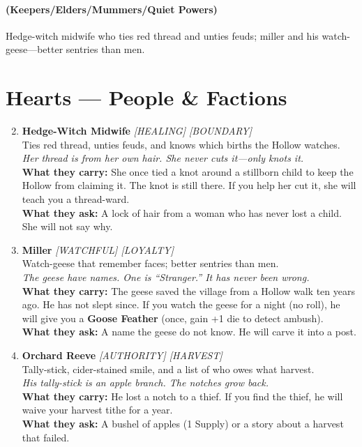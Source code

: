 \paragraph*{(Keepers/Elders/Mummers/Quiet Powers)} Hedge-witch midwife who ties red thread and unties feuds; miller and his watch-geese---better sentries than men.

\section*{Hearts --- People \& Factions}
\label{sec:aelaerem-people}
\begin{enumerate}
\setcounter{enumi}{1}
\item \textbf{Hedge-Witch Midwife} \hfill \textit{[HEALING] [BOUNDARY]} \\
  Ties red thread, unties feuds, and knows which births the Hollow watches. \\
  \textit{Her thread is from her own hair. She never cuts it---only knots it.} \\
  \textbf{What they carry:} She once tied a knot around a stillborn child to keep the Hollow from claiming it. The knot is still there. If you help her cut it, she will teach you a thread-ward. \\
  \textbf{What they ask:} A lock of hair from a woman who has never lost a child. She will not say why.

\item \textbf{Miller} \hfill \textit{[WATCHFUL] [LOYALTY]} \\
  Watch-geese that remember faces; better sentries than men. \\
  \textit{The geese have names. One is ``Stranger.'' It has never been wrong.} \\
  \textbf{What they carry:} The geese saved the village from a Hollow walk ten years ago. He has not slept since. If you watch the geese for a night (no roll), he will give you a \textbf{Goose Feather} (once, gain +1 die to detect ambush). \\
  \textbf{What they ask:} A name the geese do not know. He will carve it into a post.

\item \textbf{Orchard Reeve} \hfill \textit{[AUTHORITY] [HARVEST]} \\
  Tally-stick, cider-stained smile, and a list of who owes what harvest. \\
  \textit{His tally-stick is an apple branch. The notches grow back.} \\
  \textbf{What they carry:} He lost a notch to a thief. If you find the thief, he will waive your harvest tithe for a year. \\
  \textbf{What they ask:} A bushel of apples (1 Supply) or a story about a harvest that failed.


\end{enumerate}

